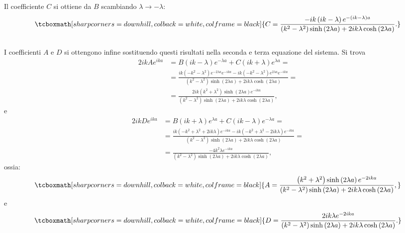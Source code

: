 \documentclass[a4paper,12pt,oneside]{book}
\begin{document}
Il coefficiente $C$ si ottiene da $B$ scambiando $\lambda \rightarrow -\lambda$:
	\begin{equation}
		\tcboxmath[sharp corners=downhill, colback=white, colframe=black]{
			C=\frac{-ik\left(ik-\lambda \right)e^{-\left(ik-\lambda\right) a }}{\left(k^2-\lambda^2\right)\sinh \left(2\lambda a\right)+2ik\lambda \cosh\left(2\lambda a\right)}.
			}
	\end{equation}\\
	
I coefficienti $A$ e $D$ si ottengono infine sostituendo questi risultati nella seconda e terza equazione del sistema. Si trova
	\begin{align}
 2ikAe^{ika} &= B \left(ik-\lambda\right)e^{-\lambda a} +C \left(ik+\lambda\right)e^{\lambda a}=\nonumber \\[0.3cm]
	& = \displaystyle{\frac{ik\left(-k^2-\lambda ^2 \right)e^{-2\lambda a }e^{-ika }-ik\left(-k^2-\lambda ^2 \right)e^{2\lambda a }e^{-ika }}{\left(k^2-\lambda^2\right)\sinh \left(2\lambda a\right)+2ik\lambda \cosh\left(2\lambda a\right)}=} \nonumber \\[0.3cm]
	&\displaystyle{ =\frac{2ik\left(k^2+\lambda ^2 \right)\sinh\left(2\lambda a\right)e^{-ika}}{\left(k^2-\lambda^2\right)\sinh \left(2\lambda a\right)+2ik\lambda \cosh\left(2\lambda a\right)}},
	\end{align}
e
	\begin{align}
		2ikD e^{ika} &= B\left(ik+\lambda\right)e^{\lambda a} + C\left(ik-\lambda\right)e^{-\lambda a} = \nonumber \\[0.3cm]
		& = \displaystyle{\frac{ik\left(-k^2 + \lambda ^2 +2ik\lambda\right)e^{-ika}-ik\left(-k^2 + \lambda ^2 -2ik\lambda\right)e^{-ika}}{\left(k^2-\lambda^2\right)\sinh \left(2\lambda a\right)+2ik\lambda \cosh\left(2\lambda a\right)}=} \nonumber \\[0.3cm]
	&\displaystyle{ =\frac{-4k^2\lambda e^{-ika}}{\left(k^2-\lambda^2\right)\sinh \left(2\lambda a\right)+2ik\lambda \cosh\left(2\lambda a\right)}},
	\end{align}
ossia:
	\begin{equation}
		\tcboxmath[sharp corners=downhill, colback=white, colframe=black]{
			A=\frac{\left(k^2+\lambda ^2\right)\sinh\left(2\lambda a \right)e^{-2ika}}{\left(k^2-\lambda^2\right)\sinh \left(2\lambda a\right)+2ik\lambda \cosh\left(2\lambda a\right)},
			}
	\end{equation}
e
	\begin{equation}
		\tcboxmath[sharp corners=downhill, colback=white, colframe=black]{
			D=\frac{2ik\lambda e^{-2ika}}{\left(k^2-\lambda^2\right)\sinh \left(2\lambda a\right)+2ik\lambda \cosh\left(2\lambda a\right)}.
			}
	\end{equation}\\
	
\end{document}
